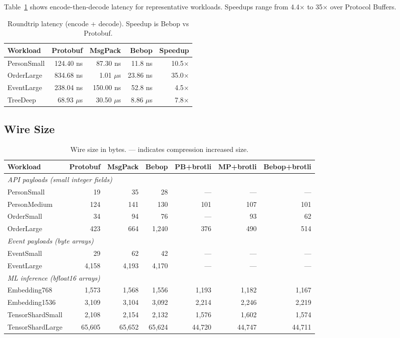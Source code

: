 \documentclass[11pt,onecolumn]{article}
\begin{document}
Table~\ref{tab:roundtrip} shows encode-then-decode latency for representative workloads. Speedups range from 4.4$\times$ to 35$\times$ over Protocol Buffers.

\begin{table}[ht]
\centering
\begin{tabular}{@{}lrrrr@{}}
\toprule
\textbf{Workload} & \textbf{Protobuf} & \textbf{MsgPack} & \textbf{Bebop} & \textbf{Speedup} \\
\midrule
PersonSmall & 124.40 ns & 87.30 ns & 11.8 ns & 10.5$\times$ \\
OrderLarge & 834.68 ns & 1.01 $\mu$s & 23.86 ns & 35.0$\times$ \\
EventLarge & 238.04 ns & 150.00 ns & 52.8 ns & 4.5$\times$ \\
TreeDeep & 68.93 $\mu$s & 30.50 $\mu$s & 8.86 $\mu$s & 7.8$\times$ \\
\bottomrule
\end{tabular}
\caption{Roundtrip latency (encode + decode). Speedup is Bebop vs Protobuf.}
\label{tab:roundtrip}
\end{table}

\subsection{Wire Size}

\begin{table}[ht]
\centering
\small
\begin{tabular}{l r r r r r r}
\toprule
\textbf{Workload} & \textbf{Protobuf} & \textbf{MsgPack} & \textbf{Bebop} & \textbf{PB+brotli} & \textbf{MP+brotli} & \textbf{Bebop+brotli} \\
\midrule
\multicolumn{7}{l}{\textit{API payloads (small integer fields)}} \\
PersonSmall & 19 & 35 & 28 & --- & --- & --- \\
PersonMedium & 124 & 141 & 130 & 101 & 107 & 101 \\
OrderSmall & 34 & 94 & 76 & --- & 93 & 62 \\
OrderLarge & 423 & 664 & 1,240 & 376 & 490 & 514 \\
\midrule
\multicolumn{7}{l}{\textit{Event payloads (byte arrays)}} \\
EventSmall & 29 & 62 & 42 & --- & --- & --- \\
EventLarge & 4,158 & 4,193 & 4,170 & --- & --- & --- \\
\midrule
\multicolumn{7}{l}{\textit{ML inference (bfloat16 arrays)}} \\
Embedding768 & 1,573 & 1,568 & 1,556 & 1,193 & 1,182 & 1,167 \\
Embedding1536 & 3,109 & 3,104 & 3,092 & 2,214 & 2,246 & 2,219 \\
TensorShardSmall & 2,108 & 2,154 & 2,132 & 1,576 & 1,602 & 1,574 \\
TensorShardLarge & 65,605 & 65,652 & 65,624 & 44,720 & 44,747 & 44,711 \\
\bottomrule
\end{tabular}
\caption{Wire size in bytes. --- indicates compression increased size.}
\label{tab:wire-size}
\end{table}
\end{document}

